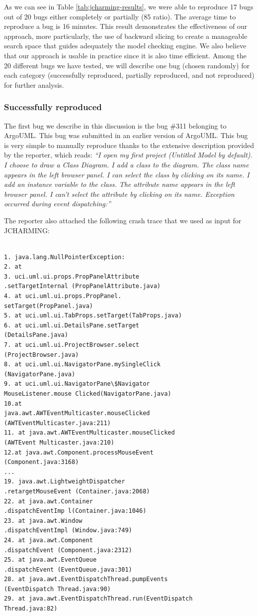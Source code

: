 As we can see in Table \ref{tab:jcharming-results}, we were able to reproduce 17 bugs
out of 20 bugs either completely or partially (85%
ratio). The average time to reproduce a bug is 16 minutes.
This result demonstrates the effectiveness of our approach,
more particularly, the use of backward slicing to create a
manageable search space that guides adequately the model
checking engine. We also believe that our approach is usable
in practice since it is also time efficient. Among the 20 different bugs we have tested, we will describe
one bug (chosen randomly) for each category (successfully
reproduced, partially reproduced, and not reproduced) for
further analysis.

\subsubsection{Successfully reproduced}

The first bug we describe in this discussion is the bug \#311
belonging to ArgoUML. This bug was submitted in an earlier
version of ArgoUML. This bug is very simple to manually
reproduce thanks to the extensive description provided by the
reporter, which reads: {\it ``I open my first project (Untitled Model by default). I choose
to draw a Class Diagram. I add a class to the diagram. The
class name appears in the left browser panel. I can select the
class by clicking on its name. I add an instance variable to the
class. The attribute name appears in the left browser panel. I
can't select the attribute by clicking on its name. Exception
occurred during event dispatching:''}

The reporter also attached the following crash trace that we
used as input for JCHARMING:

\begin{lstlisting}

1. java.lang.NullPointerException:
2. at
3. uci.uml.ui.props.PropPanelAttribute
.setTargetInternal (PropPanelAttribute.java)
4. at uci.uml.ui.props.PropPanel.
setTarget(PropPanel.java)
5. at uci.uml.ui.TabProps.setTarget(TabProps.java)
6. at uci.uml.ui.DetailsPane.setTarget
(DetailsPane.java)
7. at uci.uml.ui.ProjectBrowser.select
(ProjectBrowser.java)
8. at uci.uml.ui.NavigatorPane.mySingleClick
(NavigatorPane.java)
9. at uci.uml.ui.NavigatorPane\$Navigator
MouseListener.mouse Clicked(NavigatorPane.java)
10.at
java.awt.AWTEventMulticaster.mouseClicked
(AWTEventMulticaster.java:211)
11. at java.awt.AWTEventMulticaster.mouseClicked
(AWTEvent Multicaster.java:210)
12.at java.awt.Component.processMouseEvent
(Component.java:3168)
...
19. java.awt.LightweightDispatcher
.retargetMouseEvent (Container.java:2068)
22. at java.awt.Container
.dispatchEventImp l(Container.java:1046)
23. at java.awt.Window
.dispatchEventImpl (Window.java:749)
24. at java.awt.Component
.dispatchEvent (Component.java:2312)
25. at java.awt.EventQueue
.dispatchEvent (EventQueue.java:301)
28. at java.awt.EventDispatchThread.pumpEvents
(EventDispatch Thread.java:90)
29. at java.awt.EventDispatchThread.run(EventDispatch
Thread.java:82)
\end{lstlisting}

